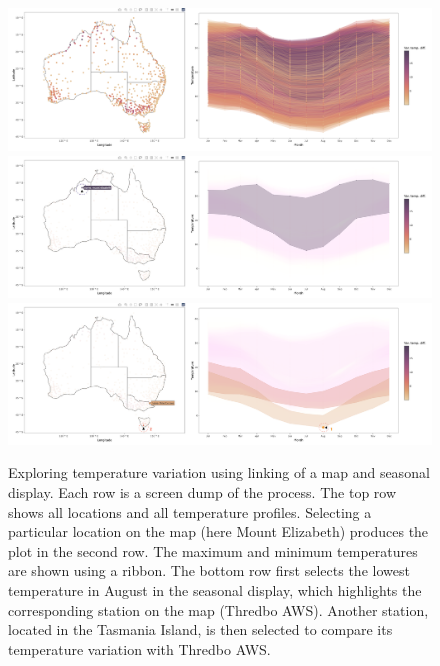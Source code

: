 \documentclass[
]{jss}
\begin{document}
\begin{CodeChunk}
\begin{figure}

{\centering \includegraphics[width=1\linewidth,height=0.23\textheight]{../figures/linking} \includegraphics[width=1\linewidth,height=0.23\textheight]{../figures/linking-north} \includegraphics[width=1\linewidth,height=0.23\textheight]{../figures/linking-lower} 

}

\caption[Exploring temperature variation using linking of a map and seasonal display]{Exploring temperature variation using linking of a map and seasonal display. Each row is a screen dump of the process. The top row shows all locations and all temperature profiles. Selecting a particular location on the map (here Mount Elizabeth) produces the plot in the second row. The maximum and minimum temperatures are shown using a ribbon. The bottom row first selects the lowest temperature in August in the seasonal display, which highlights the corresponding station on the map (Thredbo AWS). Another  station, located in the Tasmania Island, is then selected to compare its temperature variation with Thredbo AWS.}\label{fig:interactive-linking}
\end{figure}
\end{CodeChunk}
\end{document}
